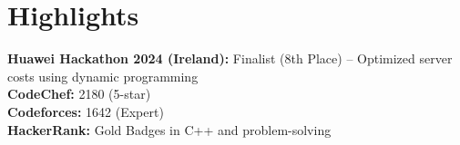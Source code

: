\vspace{-2pt}
\section{\Large Highlights}
\vspace{4pt}
\textbf{Huawei Hackathon 2024 (Ireland):} Finalist (8th Place) – Optimized server costs using dynamic programming \\
\vspace{2pt}
\textbf{CodeChef:} 2180 (5-star) \\
\vspace{2pt}
\textbf{Codeforces:} 1642 (Expert) \\
\vspace{2pt}
\textbf{HackerRank:} Gold Badges in C++ and problem-solving \\
